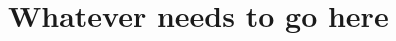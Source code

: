 \appendix 
\makeatletter
{}
\makeatother
\renewcommand{\thechapter}{\Alph{chapter}}

\chapter{Whatever needs to go here} \label{chap:appendix-a}

\Blindtext[3]